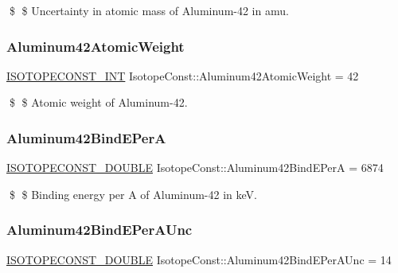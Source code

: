 \$ \$ Uncertainty in atomic mass of Aluminum-\/42 in amu. \mbox{\label{group___isotope_const-_aluminum-_al42_ga028bbda3e49da1268101a1e5c267fa58}} 
\subsubsection{\texorpdfstring{Aluminum42\+Atomic\+Weight}{Aluminum42AtomicWeight}}
{\footnotesize\ttfamily \mbox{\hyperlink{group___isotope_const-_macros_ga5f18360b3e99483a35c32d789e62621c}{I\+S\+O\+T\+O\+P\+E\+C\+O\+N\+S\+T\+\_\+\+I\+NT}} Isotope\+Const\+::\+Aluminum42\+Atomic\+Weight = 42}

\$ \$ Atomic weight of Aluminum-\/42. \mbox{\label{group___isotope_const-_aluminum-_al42_ga9ca4a5ed20307a3a448471428a26fa66}} 
\subsubsection{\texorpdfstring{Aluminum42\+Bind\+E\+PerA}{Aluminum42BindEPerA}}
{\footnotesize\ttfamily \mbox{\hyperlink{group___isotope_const-_macros_ga8f45a7272ce02c0b4c65c44636ed719a}{I\+S\+O\+T\+O\+P\+E\+C\+O\+N\+S\+T\+\_\+\+D\+O\+U\+B\+LE}} Isotope\+Const\+::\+Aluminum42\+Bind\+E\+PerA = 6874}

\$ \$ Binding energy per A of Aluminum-\/42 in keV. \mbox{\label{group___isotope_const-_aluminum-_al42_ga88a41bf3f839fdc710892f66e89f7063}} 
\subsubsection{\texorpdfstring{Aluminum42\+Bind\+E\+Per\+A\+Unc}{Aluminum42BindEPerAUnc}}
{\footnotesize\ttfamily \mbox{\hyperlink{group___isotope_const-_macros_ga8f45a7272ce02c0b4c65c44636ed719a}{I\+S\+O\+T\+O\+P\+E\+C\+O\+N\+S\+T\+\_\+\+D\+O\+U\+B\+LE}} Isotope\+Const\+::\+Aluminum42\+Bind\+E\+Per\+A\+Unc = 14}

